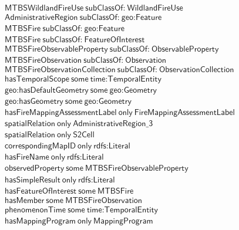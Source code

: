 \begin{align}
  \textsf{MTBSWildlandFireUse}~\textsf{subClassOf:}~\textsf{WildlandFireUse}\\
  \textsf{AdministrativeRegion}~\textsf{subClassOf:}~\textsf{geo:Feature}\\
  \textsf{MTBSFire}~\textsf{subClassOf:}~\textsf{geo:Feature}\\
  \textsf{MTBSFire}~\textsf{subClassOf:}~\textsf{FeatureOfInterest}\\
  \textsf{MTBSFireObservableProperty}~\textsf{subClassOf:}~\textsf{ObservableProperty}\\
  \textsf{MTBSFireObservation}~\textsf{subClassOf:}~\textsf{Observation}\\
  \textsf{MTBSFireObservationCollection}~\textsf{subClassOf:}~\textsf{ObservationCollection}\\
  \textsf{hasTemporalScope}~\textsf{some}~\textsf{time:TemporalEntity}\\
  \textsf{geo:hasDefaultGeometry}~\textsf{some}~\textsf{geo:Geometry}\\
  \textsf{geo:hasGeometry}~\textsf{some}~\textsf{geo:Geometry}\\
  \textsf{hasFireMappingAssessmentLabel}~\textsf{only}~\textsf{FireMappingAssessmentLabel}\\
  \textsf{spatialRelation}~\textsf{only}~\textsf{AdministrativeRegion\_3}\\
  \textsf{spatialRelation}~\textsf{only}~\textsf{S2Cell}\\
  \textsf{correspondingMapID}~\textsf{only}~\textsf{rdfs:Literal}\\
  \textsf{hasFireName}~\textsf{only}~\textsf{rdfs:Literal}\\
  \textsf{observedProperty}~\textsf{some}~\textsf{MTBSFireObservableProperty}\\
  \textsf{hasSimpleResult}~\textsf{only}~\textsf{rdfs:Literal}\\
  \textsf{hasFeatureOfInterest}~\textsf{some}~\textsf{MTBSFire}\\
  \textsf{hasMember}~\textsf{some}~\textsf{MTBSFireObservation}\\
  \textsf{phenomenonTime}~\textsf{some}~\textsf{time:TemporalEntity}\\
  \textsf{hasMappingProgram}~\textsf{only}~\textsf{MappingProgram}\end{align}



